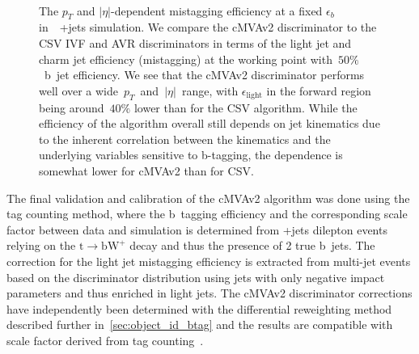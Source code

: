 \begin{figure}
\begin{centering}
 \\
\caption[The cMVAv2 mistagging probability as a function of jet kinematics.]{The $p_T$ and $|\eta|$-dependent mistagging efficiency at a fixed $\epsilon_{b}$ in~\ttbar~+jets simulation. We compare the cMVAv2 discriminator to the CSV IVF and AVR discriminators in terms of the light jet and charm jet efficiency (mistagging) at the working point with~$50\%$~b~jet efficiency. We see that the cMVAv2 discriminator performs well over a wide~$p_T$~and~$|\eta|$~range, with $\epsilon_{\mathrm{light}}$ in the forward region being around~$40\%$ lower than for the CSV algorithm. While the efficiency of the algorithm overall still depends on jet kinematics due to the inherent correlation between the kinematics and the underlying variables sensitive to b-tagging, the dependence is somewhat lower for cMVAv2 than for CSV.}
\label{fig:btag_kinematics}
\end{centering}
\end{figure}

The final validation and calibration of the cMVAv2 algorithm was done using the tag counting method, where the b~tagging efficiency and the corresponding scale factor between data and simulation is determined from \ttbar+jets dilepton events relying on the $\mathrm{t} \rightarrow \mathrm{b} \mathrm{W}^+$ decay and thus the presence of 2 true b~jets. The correction for the light jet mistagging efficiency is extracted from multi-jet events based on the discriminator distribution using jets with only negative impact parameters and thus enriched in light jets. The cMVAv2 discriminator corrections have independently been determined with the differential reweighting method described further in~\cref{sec:object_id_btag} and the results are compatible with scale factor derived from tag counting~\cite{CMS-PAS-BTV-15-001}. 

